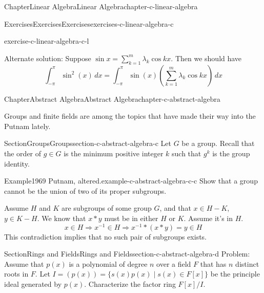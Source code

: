 \documentclass[oneside,10pt,]{book}
\numberwithin{equation}{section}
\begin{document}
\begin{chapterptx}{Chapter}{Linear Algebra}{}{Linear Algebra}{}{}{chapter-c-linear-algebra}
\begin{exercises-section}{Exercises}{Exercises}{}{Exercises}{}{}{exercises-c-linear-algebra-c}
\begin{divisionexercise}{11}{}{}{exercise-c-linear-algebra-c-l}
\par
Alternate solution: Suppose \(\sin x = \sum_{k=1}^m \lambda_k \cos{k x}\). Then we should have%
\begin{equation*}
\int_{-\pi }^{\pi } \sin^2(x) \, dx = \int_{-\pi }^{\pi } \sin(x)(\sum_{k=1}^m \lambda_k \cos{k x} ) \, dx
\end{equation*}
%
\end{divisionexercise}%
\end{exercises-section}
\end{chapterptx}
%
%
\typeout{************************************************}
\typeout{************************************************}
%
\begin{chapterptx}{Chapter}{Abstract Algebra}{}{Abstract Algebra}{}{}{chapter-c-abstract-algebra}
\renewcommand*{\chaptername}{Chapter}
\begin{introduction}{}%
Groups and finite fields are among the topics that have made their way into the Putnam lately.%
\end{introduction}%
%
%
\typeout{************************************************}
\typeout{************************************************}
%
\begin{sectionptx}{Section}{Groups}{}{Groups}{}{}{section-c-abstract-algebra-c}
Let \(G\) be a group. Recall that the order of  \(g \in G\) is the minimum positive integer \(k\) such that \(g^k\) is the group identity.%
\begin{example}{Example}{1969 Putnam, altered.}{example-c-abstract-algebra-c-c}%
Show that a group cannot be the union of two of its proper subgroups.%
\par
Assume \(H\) and \(K\) are subgroups of some group \(G\), and that \(x \in H-K\), \(y \in K-H\).  We know that \(x*y\) must be in either \(H\) or \(K\).  Assume it's in \(H\).%
\begin{equation*}
x \in H \Rightarrow x^{-1} \in H \Rightarrow x^{-1}*(x*y) = y \in H
\end{equation*}
This contradiction implies that no such pair of subgroups exists.%
\end{example}
\end{sectionptx}
%
%
\typeout{************************************************}
\typeout{************************************************}
%
\begin{sectionptx}{Section}{Rings and Fields}{}{Rings and Fields}{}{}{section-c-abstract-algebra-d}
Problem: Assume that \(p(x)\) is a polynomial of degree \(n\) over a field \(F\) that has \(n\) distinct roots in \(F\). Let \(I=(p(x)) = \{s(x)p(x) \mid s(x)\in F[x]\}\) be the principle ideal generated by \(p(x)\).  Characterize the factor ring \(F[x]/I\).%

\end{sectionptx}
\end{chapterptx}
\end{document}
